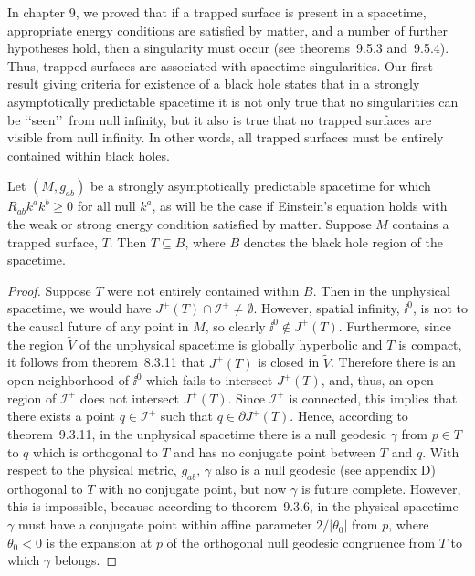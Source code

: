 In chapter 9, we proved that if a trapped surface is present in a spacetime,
appropriate energy conditions are satisfied by matter, and a number of further
hypotheses hold, then a singularity must occur (see theorems~9.5.3 and~9.5.4). Thus,
trapped surfaces are associated with spacetime singularities. Our first result giving
criteria for existence of a black hole states that in a strongly asymptotically
predictable spacetime it is not only true that no singularities can be \lq\lq seen\rq\rq\
from null infinity, but it also is true that no trapped surfaces are visible from null
infinity. In other words, all trapped surfaces must be entirely contained within black
holes.

\begin{proposition}\label{prop:12.2.2}
Let \((M,g_{ab})\) be a strongly asymptotically predictable spacetime for which
\(R_{ab}k^ak^b\ge0\) for all null \(k^a\), as will be the case if Einstein's equation
holds with the weak or strong energy condition satisfied by matter. Suppose \(M\)
contains a trapped surface, \(T\). Then \(T\subseteq B\), where \(B\) denotes the
black hole region of the spacetime.
\end{proposition}
\begin{proof}
Suppose \(T\) were not entirely contained within \(B\). Then in the unphysical
spacetime, we would have \(J^+(T)\cap\mathcal I^+\ne\emptyset\). However, spatial
infinity, \(\ii^0\), is not to the causal future of any point in \(M\), so clearly
\(\ii^0\notin J^+(T)\). Furthermore, since the region \(\widetilde V\) of the
unphysical spacetime is globally hyperbolic and \(T\) is compact, it follows from
theorem~8.3.11 that \(J^+(T)\) is closed in \(\widetilde V\). Therefore there is an
open neighborhood of \(\ii^0\) which fails to intersect \(J^+(T)\), and, thus, an open
region of \(\mathcal I^+\) does not intersect \(J^+(T)\). Since \(\mathcal I^+\) is
connected, this implies that there exists a point \(q\in\mathcal I^+\) such that
\(q\in\partial J^+(T)\). Hence, according to theorem~9.3.11, in the unphysical
spacetime there is a null geodesic \(\gamma\) from \(p\in T\) to \(q\) which is
orthogonal to \(T\) and has no conjugate point between \(T\) and \(q\). With respect
to the physical metric, \(g_{ab}\), \(\gamma\) also is a null geodesic (see appendix
D) orthogonal to \(T\) with no conjugate point, but now \(\gamma\) is future
complete. However, this is impossible, because according to theorem~9.3.6, in the
physical spacetime \(\gamma\) must have a conjugate point within affine parameter
\(2/|\theta_0|\) from \(p\), where \(\theta_0<0\) is the expansion at \(p\) of the
orthogonal null geodesic congruence from \(T\) to which \(\gamma\) belongs.
\end{proof}

